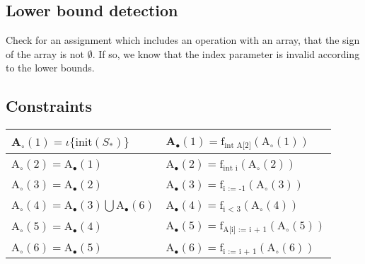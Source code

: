 % 

\subsection{Lower bound detection}
Check for an assignment which includes an operation with an array, that the sign of the array is not $\emptyset$. If so, we know that the index parameter is invalid according to the lower bounds.

\subsection{Constraints}
\begin{table}[H]
\begin{tabular}{| l | l |}
\hline
A$_\circ (1) = \iota \{\text{init}(S_*) \} $ & A$_\bullet(1) = \text{f}_{\text{int A[2]}} (\text{A}_\circ (1))$ \\
\hline
A$_\circ (2) =$A$_\bullet(1) $ & A$_\bullet(2) = \text{f}_{\text{int i}} (\text{A}_\circ (2))$ \\
\hline
A$_\circ (3) = $A$_\bullet(2)$ & A$_\bullet(3) = \text{f}_{\text{i := -1}} (\text{A}_\circ (3))$  \\
\hline
A$_\circ (4) = $A$_\bullet(3) \bigcup $A$_\bullet(6) $ & A$_\bullet(4) = \text{f}_{\text{i < 3}} (\text{A}_\circ (4))$ \\
\hline
A$_\circ (5) = $A$_\bullet(4)$ & A$_\bullet(5) = \text{f}_{\text{A[i] := i + 1}} (\text{A}_\circ (5))$ \\
\hline
A$_\circ (6) = $A$_\bullet(5)$ & A$_\bullet(6) = \text{f}_{\text{i := i + 1}} (\text{A}_\circ (6))$ \\

\hline
\end{tabular}
\centering
\end{table}

